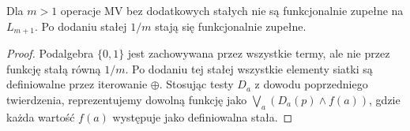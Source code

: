 \begin{wniosek}
\label{cor:ncl-finite-mv-functional}
Dla $m>1$ operacje MV bez dodatkowych stałych
nie są funkcjonalnie zupełne na $L_{m+1}$.
Po dodaniu stałej $1/m$ stają się funkcjonalnie zupełne.
\end{wniosek}
\begin{proof}
Podalgebra $\{0,1\}$ jest zachowywana przez wszystkie
termy, ale nie przez funkcję stałą równą $1/m$.
Po dodaniu tej stałej wszystkie elementy siatki
są definiowalne przez iterowanie $\oplus$.
Stosując testy $D_a$ z dowodu poprzedniego twierdzenia,
reprezentujemy dowolną funkcję jako
$\bigvee_a(D_a(p)\wedge f(a))$, gdzie każda wartość
$f(a)$ występuje jako definiowalna stała.
\end{proof}

